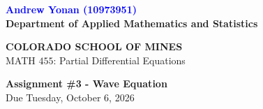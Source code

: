 \documentclass[12pt]{article}
\begin{document}
\begin{flushleft}
\textcolor{blue}{\textbf{Andrew Yonan (10973951) \\}}
\textbf{Department of Applied Mathematics and Statistics}

\textbf{COLORADO SCHOOL OF MINES}\\


MATH $455$: Partial Differential Equations
\end{flushleft}

\vspace{0.1in}

\begin{center}
{\bf Assignment \#3 - Wave Equation} \\
Due Tuesday, October 6, 2026 \\
\end{center}

\vspace{0.1in}
\end{document}
